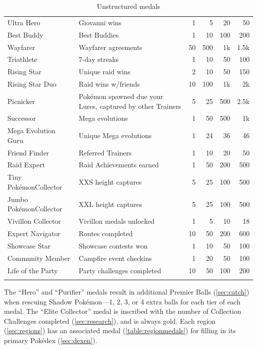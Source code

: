 \begin{longtable}{m{}m{}rrrr}
Ultra Hero & Giovanni wins & 1 & 5 & 20 & 50\\
Best Buddy & Best Buddies & 1 & 10 & 100 & 200\\
Wayfarer & Wayfarer agreements & 50 & 500 & 1k & 1.5k\\
Triathlete & 7-day streaks & 1 & 10 & 50 & 100\\
Rising Star & Unique raid wins & 2 & 10 & 50 & 150\\
Rising Star Duo & Raid wins w/friends & 10 & 100 & 1k & 2k\\
Picnicker & Pokémon spawned due your Lures, captured by other Trainers & 5 & 25 & 500 & 2.5k\\
Successor & Mega evolutions & 1 & 50 & 500 & 1k\\
Mega Evolution Guru & Unique Mega evolutions & 1 & 24 & 36 & 46\\
Friend Finder & Referred Trainers & 1 & 10 & 20 & 50\\
Raid Expert & Raid Achievements earned & 1 & 50 & 200 & 500\\
Tiny Pokémon\newline{}Collector & XXS height captures & 5 & 25 & 100 & 500\\
Jumbo Pokémon\newline{}Collector & XXL height captures & 5 & 25 & 100 & 500\\
Vivillon Collector & Vivillon medals unlocked & 1 & 5 & 10 & 18\\
Expert Navigator & Routes completed & 10 & 50 & 200 & 600\\
Showcase Star & Showcase contests won & 1 & 10 & 50 & 100\\
Community Member & Campfire event checkins & 1 & 20 & 50 & 100\\
Life of the Party & Party challenges completed & 10 & 50 & 100 & 200\\
\caption{Unstructured medals}
\label{table:medals}
\end{longtable}
\endgroup
The ``Hero'' and ``Purifier'' medals result in additional Premier Balls (\autoref{sec:catch})
  when rescuing Shadow Pokémon---1, 2, 3, or 4 extra balls for each tier of each medal.
The ``Elite Collector'' medal is inscribed with the number of Collection
  Challenges completed (\autoref{sec:research}), and is always gold.
Each region (\autoref{sec:regions}) has an associated medal (\autoref{table:regionmedals}) for filling
  in its primary Pokédex (\autoref{sec:dexen}).
